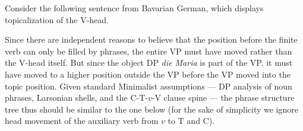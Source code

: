 Consider the following sentence from Bavarian German, which displays topicalization of the V-head.
%
\begin{exe}
\end{exe}
%
Since there are independent reasons to believe that the position before the finite verb can only be filled by phrases, the entire VP must have moved rather than the V-head itself.
But since the object DP \emph{die Maria} is part of the VP, it must have moved to a higher position outside the VP before the VP moved into the topic position.
Given standard Minimalist assumptions --- DP analysis of noun phrases, Larsonian shells, and the C-T-$v$-V clause spine --- the phrase structure tree thus should be similar to the one below (for the sake of simplicity we ignore head movement of the auxiliary verb from $v$ to T and C).
%
\begin{center}
\end{center}

